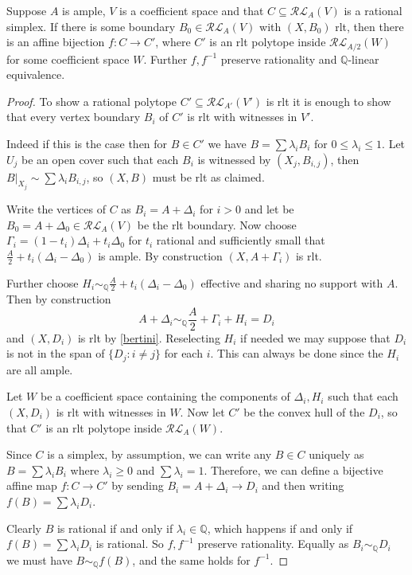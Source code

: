 	\begin{lemma}\label{rlt-repl}
		Suppose $A$ is ample, $V$ is a coefficient space and that $C\subseteq \mathcal{RL}_{A}(V)$ is a rational simplex. If there is some boundary $B_{0} \in \mathcal{RL}_{A}(V)$ with $(X,B_{0})$ rlt, then there is an affine bijection $f:C \to C'$, where $C'$ is an rlt polytope inside $\mathcal{RL}_{A/2}(W)$ for some coefficient space $W$. Further $f, f^{-1}$ preserve rationality and $\mathbb{Q}$-linear equivalence.
	\end{lemma}

	\begin{proof}
		To show a rational polytope $C'\subseteq \mathcal{RL}_{A'}(V')$ is rlt it is enough to show that every vertex boundary $B_{i}$ of $C'$ is rlt with witnesses in $V'$.
				
		Indeed if this is the case then for $B \in C'$ we have $B= \sum \lambda_{i} B_{i}$ for $0 \leq \lambda_{i} \leq 1$. Let $U_{j}$ be an open cover such that each $B_{i}$ is witnessed by $(X_{j},B_{i,j})$, then $B|_{X_{j}}\sim \sum \lambda_{i}B_{i,j}$, so $(X,B)$ must be rlt as claimed.
		
		
		
		Write the vertices of $C$ as $B_{i}=A+\Delta_{i}$ for $i > 0$ and let be $B_{0}=A+\Delta_{0} \in \mathcal{RL}_{A}(V)$ be the rlt boundary. Now choose $\Gamma_{i} =(1-t_{i})\Delta_{i}+t_{i}\Delta_{0}$ for $t_{i}$ rational and sufficiently small that $\frac{A}{2}+t_{i}(\Delta_{i}-\Delta_{0})$ is ample. By construction $(X,A+\Gamma_{i})$ is rlt.
		
		Further choose $H_{i} \sim_{\mathbb{Q}} \frac{A}{2}+t_{i}(\Delta_{i}-\Delta_{0})$ effective and sharing no support with $A$. Then by construction
		\[A+\Delta_{i} \sim_{\mathbb{Q}} \frac{A}{2}+\Gamma_{i}+H_{i}=D_{i}\]
		and $(X,D_{i})$ is rlt by \autoref{bertini}. Reselecting $H_{i}$ if needed we may suppose that $D_{i}$ is not in the span of $\{D_{j}: i \neq j\}$ for each $i$. This can always be done since the $H_{i}$ are all ample.
		
		Let $W$ be a coefficient space containing the components of $\Delta_{i}, H_{i}$ such that each $(X,D_{i})$ is rlt with witnesses in $W$. Now let $C'$ be the convex hull of the $D_{i}$, so that $C'$ is an rlt polytope inside $\mathcal{RL}_{A}(W)$.
		
		Since $C$ is a simplex, by assumption, we can write any $B \in C$ uniquely as $B=\sum \lambda_{i} B_{i}$ where $\lambda_{i} \geq 0$ and $\sum \lambda_{i} =1$. Therefore, we can define a bijective affine map $f: C \to C'$ by sending $B_{i}=A+\Delta_{i} \to D_{i}$ and then writing $f(B)= \sum \lambda_{i} D_{i}$.
		
		Clearly $B$ is rational if and only if $\lambda_{i} \in \mathbb{Q}$, which happens if and only if $f(B)=\sum \lambda_{i} D_{i}$ is rational. So $f, f^{-1}$ preserve rationality. Equally as $B_{i} \sim_{\mathbb{Q}} D_{i}$ we must have $B \sim_{\mathbb{Q}} f(B)$, and the same holds for $f^{-1}$.
			
	\end{proof}

